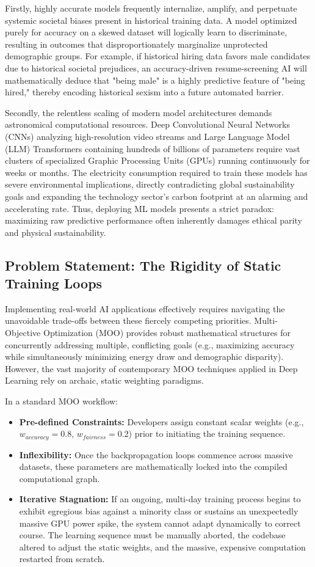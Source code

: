 \documentclass[12pt,a4paper]{article}
\begin{document}
Firstly, highly accurate models frequently internalize, amplify, and perpetuate systemic societal biases present in historical training data. A model optimized purely for accuracy on a skewed dataset will logically learn to discriminate, resulting in outcomes that disproportionately marginalize unprotected demographic groups. For example, if historical hiring data favors male candidates due to historical societal prejudices, an accuracy-driven resume-screening AI will mathematically deduce that "being male" is a highly predictive feature of "being hired," thereby encoding historical sexism into a future automated barrier. 

Secondly, the relentless scaling of modern model architectures demands astronomical computational resources. Deep Convolutional Neural Networks (CNNs) analyzing high-resolution video streams and Large Language Model (LLM) Transformers containing hundreds of billions of parameters require vast clusters of specialized Graphic Processing Units (GPUs) running continuously for weeks or months. The electricity consumption required to train these models has severe environmental implications, directly contradicting global sustainability goals and expanding the technology sector's carbon footprint at an alarming and accelerating rate. Thus, deploying ML models presents a strict paradox: maximizing raw predictive performance often inherently damages ethical parity and physical sustainability.

\subsection{Problem Statement: The Rigidity of Static Training Loops}
Implementing real-world AI applications effectively requires navigating the unavoidable trade-offs between these fiercely competing priorities. Multi-Objective Optimization (MOO) provides robust mathematical structures for concurrently addressing multiple, conflicting goals (e.g., maximizing accuracy while simultaneously minimizing energy draw and demographic disparity). However, the vast majority of contemporary MOO techniques applied in Deep Learning rely on archaic, static weighting paradigms. 

In a standard MOO workflow:
\begin{itemize}
    \item \textbf{Pre-defined Constraints:} Developers assign constant scalar weights (e.g., $w_{accuracy} = 0.8$, $w_{fairness} = 0.2$) prior to initiating the training sequence.
    \item \textbf{Inflexibility:} Once the backpropagation loops commence across massive datasets, these parameters are mathematically locked into the compiled computational graph.
    \item \textbf{Iterative Stagnation:} If an ongoing, multi-day training process begins to exhibit egregious bias against a minority class or sustains an unexpectedly massive GPU power spike, the system cannot adapt dynamically to correct course. The learning sequence must be manually aborted, the codebase altered to adjust the static weights, and the massive, expensive computation restarted from scratch.
\end{itemize}
\end{document}
